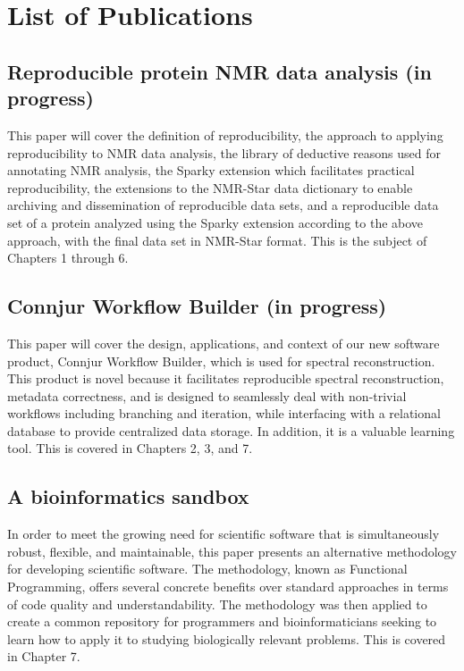 \chapter{List of Publications}

\section{Reproducible protein NMR data analysis (in progress)}
This paper will cover the definition of reproducibility, the approach to
applying reproducibility to NMR data analysis, the library of deductive
reasons used for annotating NMR analysis, the Sparky extension which 
facilitates practical reproducibility, the extensions to the NMR-Star
data dictionary to enable archiving and dissemination of reproducible
data sets, and a reproducible data set of a protein analyzed using the Sparky
extension according to the above approach, with the final data set in 
NMR-Star format.  This is the subject of Chapters 1 through 6.


\section{Connjur Workflow Builder (in progress)}
This paper \cite{connjur-wb} will cover the design, applications, and context
of our new software product, Connjur Workflow Builder, which is used for
spectral reconstruction.  This product is novel because it facilitates 
reproducible spectral reconstruction, metadata correctness, and is designed
to seamlessly deal with non-trivial workflows including branching and 
iteration, while interfacing with a relational database to provide centralized
data storage.  In addition, it is a valuable learning tool.  This is covered
in Chapters 2, 3, and 7.


\section{A bioinformatics sandbox}
In order to meet the growing need for scientific software that is 
simultaneously robust, flexible, and maintainable, this paper 
\cite{fenwick2012} presents an alternative methodology for developing scientific
software.  The methodology, known as Functional Programming, offers several
concrete benefits over standard approaches in terms of code quality and
understandability.  The methodology was then applied to create a common 
repository for programmers and bioinformaticians seeking to learn how to apply
it to studying biologically relevant problems.  This is covered in Chapter 7.


